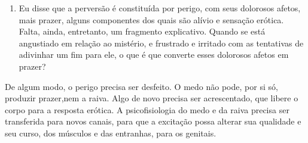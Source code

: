 \begin{enumerate}
Se a solução vai ou não na direção da sintomatologia neurótica, sem
um contorno nítido a acompanhá-la, o prazer erótico subjetivo depende,
creio, da natureza exata do sistema sutil, complicado, de recompensa e
punição que cada família, em geral sobretudo a mãe, desenvolve. Nas
perversões --- as neuroses eróticas --- a sensação de mistério e de
perigo se acentua, pois a criança foi traumatizada ou superestimulada
exatamente no ponto do mistério: os genitais, ou o desejo de
investigá-los. Fenichel\idxfenic{} sugere algo assim ao dizer que
``indivíduos em quem a angústia da castração\idxcasta{} foi provocada
muito subitamente, e de modo intenso, são candidatos a um posterior
desenvolvimento de fetichismo'' (19, p.\,342); ele indica
assim, tal qual Freud\idxfreudperve{} fez antes, que a perversão pode resultar como uma
``cura'' para a angústia provocada pela
conscientização da existência da possibilidade de que se venha a perder\idxpervneuro[|)]
o próprio sexo. (Ver também 1, 53---55, 57, 58; 137, capítulo 19.)

\item Eu disse que a perversão é constituída por perigo, com seus
dolorosos afetos, mais prazer, alguns componentes dos quais são alívio
e sensação erótica. Falta, ainda, entretanto, um fragmento explicativo.
Quando se está angustiado em relação ao mistério, e frustrado e
irritado com as tentativas de adivinhar um fim para ele, o que é que
converte esses dolorosos afetos em prazer?
\end{enumerate}


De algum modo, o perigo precisa ser desfeito. O medo não pode, por
si só, produzir prazer,\idxpraz[|(] nem a raiva. Algo de novo precisa ser
acrescentado, que libere o corpo para a resposta erótica. A
psicofisiologia do medo e da raiva precisa ser transferida para novos
canais, para que a excitação possa alterar sua qualidade e seu curso,
dos músculos e das entranhas, para os genitais.

